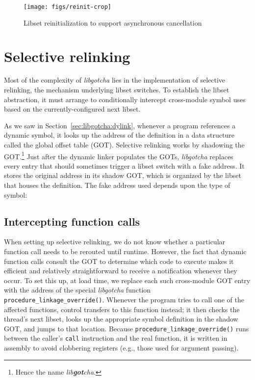 \begin{figure}
\texttt{[image: figs/reinit-crop]}
\caption{Libset reinitialization to support asynchronous cancellation}
\label{fig:reinit}
\end{figure}


\section{Selective relinking}
\label{sec:libgotcha:relink}

Most of the complexity of \textit{libgotcha} lies in the implementation of selective
relinking, the mechanism underlying libset switches.  To establish the libset
abstraction, it must arrange to conditionally intercept cross-module symbol
uses based on the currently-configured next libset.

As we saw in Section~\ref{sec:libgotcha:dylink}, whenever a program references a
dynamic symbol, it looks up the address of the definition in a data structure called
the global offset table (GOT).  Selective relinking works by shadowing the
GOT.\footnote{Hence the name \textit{lib\textbf{got}cha}.}  Just after the dynamic
linker populates the GOTs, \textit{libgotcha} replaces every entry that should
sometimes trigger a libset switch with a fake address.  It stores the original
address in its shadow GOT, which is organized by the libset that houses the
definition.  The fake address used depends upon the type of symbol:


\subsection{Intercepting function calls}
\label{sec:libgotcha:functions}

When setting up selective relinking, we do not know whether a particular function
call needs to be rerouted until runtime.  However, the fact that dynamic function
calls consult the GOT to determine which code to execute makes it efficient and
relatively straightforward to receive a notification whenever they occur.  To set
this up, at load time, we replace each such cross-module GOT entry with the address
of the special \textit{libgotcha} function \texttt{procedure\_linkage\_override()}.
Whenever the program tries to call one of the affected functions, control transfers
to this function instead; it then checks the thread's next libset, looks up the
appropriate symbol definition in the shadow GOT, and jumps to that location.  Because
\texttt{procedure\_linkage\_override()} runs between the caller's \texttt{call}
instruction and the real function, it is written in assembly to avoid clobbering
registers (e.g., those used for argument passing).

